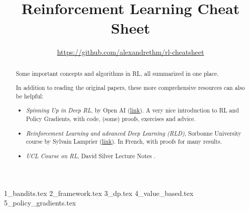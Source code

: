 \documentclass{article}
\title{\Large{Reinforcement Learning Cheat Sheet}}
\author{
  \url{https://github.com/alexandrethm/rl-cheatsheet}
}
\begin{document}
\maketitle

\begin{abstract}
Some important concepts and algorithms in RL, all summarized in one place.

In addition to reading the original papers, these more comprehensive resources can also be helpful:
\begin{itemize}
  \item \emph{Spinning Up in Deep RL}, by Open AI (\href{https://spinningup.openai.com/en/latest/index.html}{link}). A very nice introduction to RL and Policy Gradients, with code, (some) proofs, exercises and advice.
  \item \emph{Reinforcement Learning and advanced Deep Learning (RLD)}, Sorbonne University course by Sylvain Lamprier (\href{https://dac.lip6.fr/master/rladl/}{link}). In French, with proofs for many results.
  \item \emph{UCL Course on RL}, David Silver Lecture Notes \cite{silver2015}.
\end{itemize}


\end{abstract}

\setcounter{tocdepth}{3}
\tableofcontents{}
\newpage

{1_bandits.tex}
{2_framework.tex}
{3_dp.tex}
{4_value_based.tex}
{5_policy_gradients.tex}

\medskip

\footnotesize

\end{document}
